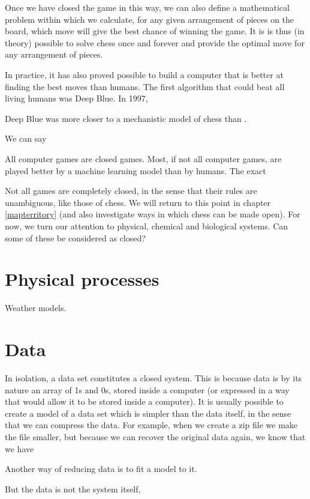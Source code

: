 Once we have closed the game in this way, we can also define a mathematical problem within which we calculate, for any given arrangement of pieces on the board, which move will give the best chance of winning the game. It is is thus (in theory) possible to solve chess once and forever and provide the optimal move for any arrangement of pieces. 

In practice, it has also proved possible to build a computer that is better at finding the best moves than humans. The first algorithm that could beat all living humans was Deep Blue. In 1997,

Deep Blue was more closer to a mechanistic model of chess than . 



We can say 

All computer games are closed games. Most, if not all computer games, are played better by a machine learning model than by humans. The exact 



Not all games are completely closed, in the sense that their rules are unambiguous, like those of chess. We will return to this point in chapter \ref{mapterritory} (and also investigate ways in which chess can be made open). For now, we turn our attention to physical, chemical and biological systems. Can some of these be considered as closed?


\section{Physical processes}


Weather models.


\section{Data}

In isolation, a data set constitutes a closed system. This is because data is by its nature an array of 1s and 0s, stored inside a computer (or expressed in a way that would allow it to be stored inside a computer). It is usually possible to create a model of a data set which is simpler than the data itself, in the sense that we can compress the data. For example, when we create a zip file we make the file smaller, but because we can recover the original data again, we know that we have 

Another way of reducing data is to fit a model to it. 


But the data is not the system itself,  




